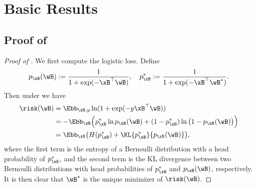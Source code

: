 \documentclass[11pt]{article}
\begin{document}



\newpage
\appendix






\section{Basic Results}
\subsection{Proof of \texorpdfstring{}{Proposition 2.1}}\label{sec:proof:risk-properties}

\begin{proof}[Proof of ]
We first compute the logistic loss. Define 
\begin{align*}
    p_{\xB}(\wB) := \frac{1}{1+\exp(-\xB^\top \wB)},\quad p^*_{\xB} := \frac{1}{1+\exp(-\xB^\top \wB^*)}.
\end{align*}
Then under  we have 
\begin{align*}
\risk(\wB) &= \Ebb_{\xB, y} \ln(1+\exp(-y \xB^\top \wB))  \\
&= - \Ebb_{\xB} \Big( p^*_{\xB} \ln p_{\xB}(\wB) + (1- p^*_{\xB} )\ln \big( 1- p_{\xB}(\wB) \big)  \Big)\\
&= \Ebb_{\xB} \big(  H(p^*_{\xB}) + \KL{p^*_{\xB}}{p_{\xB}(\wB)} \big),
\end{align*}
where the first term is the entropy of a Bernoulli distribution with a head probability of $p^*_{\xB}$, and the second term is the KL divergence between two Bernoulli distributions with head probabilities of $p^*_{\xB}$ and $p_{\xB}(\wB)$, respectively.
It is then clear that $\wB^*$ is the unique minimizer of $\risk(\wB)$.


\end{proof}
\end{document}
